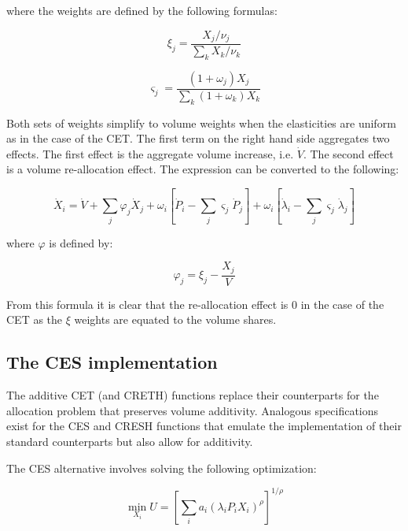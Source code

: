 \noindent where the weights are defined by the following formulas:

\begin{displaymath}
\xi_j = \frac{X_j/\nu_j}{\sum_k{X_k}/\nu_k}
\end{displaymath}

\begin{displaymath}
\varsigma_j = \frac{(1+\omega_j)X_j}{\sum_k{(1+\omega_k)X_k}}
\end{displaymath}

\noindent Both sets of weights simplify to volume weights when the elasticities are uniform as in the case of the CET. The first term on the right hand side
aggregates two effects. The first effect is the aggregate volume increase,
i.e. $\dot V$. The second effect is a volume re-allocation effect. The expression can be converted to the following:

\begin{equation}
\label{eq:CRETHAllocXlin2}
\dot X_i = \dot V + \sum_j{\varphi_j \dot X_j}
+ \omega_i\left[ \dot P_i - \sum_j{\varsigma_j} \dot P_j\right]
+ \omega_i\left[ \dot \lambda_i - \sum_j{\varsigma_j} \dot \lambda_j \right]
\end{equation}

\noindent where $\varphi$ is defined by:

\begin{displaymath}
\varphi_j = \xi_j - \frac{{X_j}}{V}
\end{displaymath}

\noindent From this formula it is clear that the re-allocation effect
is 0 in the case of the CET as the $\xi$ weights are equated to the volume shares.

\fi

\subsection{The CES implementation}

The additive CET (and CRETH) functions replace their counterparts for the allocation
problem that preserves volume additivity. Analogous specifications exist for the CES and
CRESH functions that emulate the implementation of their standard counterparts
but also allow for additivity.

The CES alternative involves solving the following optimization:

\begin{displaymath}
\min_{X_i} {U={\left[ \sum\limits_i {a_i \left(\lambda_i P_i X_i \right)^{\rho}} \right]}^{1/\rho}}
\end{displaymath}

